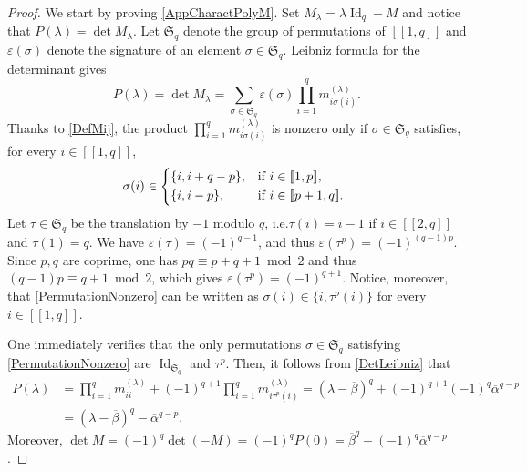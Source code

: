 \documentclass[10pt]{amsart}
\let\epsilon\varepsilon
\newcommand{\llbracket}{[\![}
\newcommand{\rrbracket}{]\!]}
\theoremstyle{plain}
\theoremstyle{definition}
\DeclareMathOperator{\id}{Id}
\providecommand{\ie}{i.e.}\providecommand{\etc}{etc.}\providecommand{\resp}{resp.}\providecommand{\cf}{cf.}
\begin{document}
\begin{proof}
We start by proving \eqref{AppCharactPolyM}. Set $M_\lambda = \lambda \id_q - M$ and notice that $P(\lambda) = \det M_\lambda$. Let $\mathfrak S_q$ denote the group of permutations of $\llbracket 1, q\rrbracket$ and $\epsilon(\sigma)$ denote the signature of an element $\sigma \in \mathfrak S_q$. Leibniz formula for the determinant gives
\begin{equation}
\label{DetLeibniz}
P(\lambda) = \det M_\lambda = \sum_{\sigma \in \mathfrak S_q} \epsilon(\sigma) \prod_{i=1}^q m_{i \sigma(i)}^{(\lambda)}.
\end{equation}
Thanks to \eqref{DefMij}, the product $\prod_{i=1}^q m_{i \sigma(i)}^{(\lambda)}$ is nonzero only if $\sigma \in \mathfrak S_q$ satisfies, for every $i \in \llbracket 1, q\rrbracket$,
\begin{equation}
\label{PermutationNonzero}
\sigma(i) \in
\begin{dcases*}
\{i, i + q - p\}, & if $i \in \llbracket 1, p\rrbracket$, \\
\{i, i - p\}, & if $i \in \llbracket p+1, q\rrbracket$.
\end{dcases*}
\end{equation}
Let $\tau \in \mathfrak S_q$ be the translation by $-1$ modulo $q$, \ie $\tau(i) = i - 1$ if $i \in \llbracket 2, q\rrbracket$ and $\tau(1) = q$. We have $\epsilon(\tau) = (-1)^{q-1}$, and thus $\epsilon(\tau^p) = (-1)^{(q-1)p}$. Since $p, q$ are coprime, one has $pq \equiv p + q + 1 \bmod 2$ and thus $(q-1)p \equiv q+1 \bmod 2$, which gives $\epsilon(\tau^p) = (-1)^{q+1}$. Notice, moreover, that \eqref{PermutationNonzero} can be written as $\sigma(i) \in \{i, \tau^p(i)\}$ for every $i \in \llbracket 1, q\rrbracket$.

One immediately verifies that the only permutations $\sigma \in \mathfrak S_q$ satisfying \eqref{PermutationNonzero} are $\id_{\mathfrak S_q}$ and $\tau^p$. Then, it follows from \eqref{DetLeibniz} that
\begin{align*}
P(\lambda) &= \prod_{i=1}^q m_{ii}^{(\lambda)} + (-1)^{q+1} \prod_{i=1}^q m_{i \tau^p(i)}^{(\lambda)} = \left(\lambda - \overline\beta\right)^q + (-1)^{q+1} (-1)^q \overline\alpha^{q - p}\\
& = \left(\lambda - \overline\beta\right)^q - \overline\alpha^{q - p}.
\end{align*}
Moreover, $\det M = (-1)^q \det(-M) = (-1)^q P(0) = \overline\beta^q - (-1)^q \overline\alpha^{q - p}$.


\end{proof}
\end{document}
